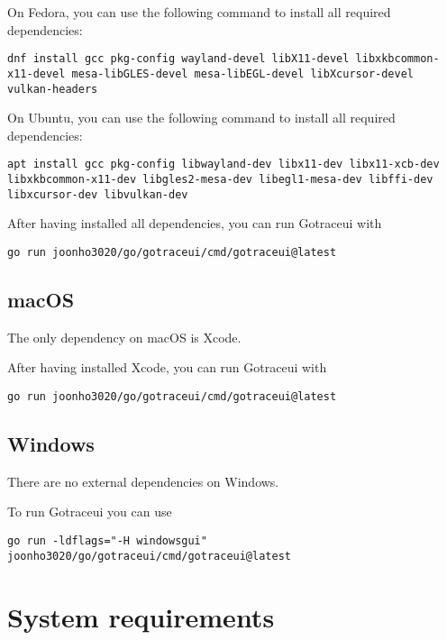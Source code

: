 \documentclass[10pt,letterpaper,oneside,openany,english]{memoir}
\begin{document}
On Fedora, you can use the following command to install all required dependencies:

\begin{verbatim}
dnf install gcc pkg-config wayland-devel libX11-devel libxkbcommon-x11-devel mesa-libGLES-devel mesa-libEGL-devel libXcursor-devel vulkan-headers
\end{verbatim}

On Ubuntu, you can use the following command to install all required dependencies:

\begin{verbatim}
apt install gcc pkg-config libwayland-dev libx11-dev libx11-xcb-dev libxkbcommon-x11-dev libgles2-mesa-dev libegl1-mesa-dev libffi-dev libxcursor-dev libvulkan-dev
\end{verbatim}

After having installed all dependencies, you can run Gotraceui with

\begin{verbatim}
go run joonho3020/go/gotraceui/cmd/gotraceui@latest
\end{verbatim}

\section*{macOS}

The only dependency on macOS is Xcode.

After having installed Xcode, you can run Gotraceui with

\begin{verbatim}
go run joonho3020/go/gotraceui/cmd/gotraceui@latest
\end{verbatim}

\section*{Windows}

There are no external dependencies on Windows.

To run Gotraceui you can use

\begin{verbatim}
go run -ldflags="-H windowsgui" joonho3020/go/gotraceui/cmd/gotraceui@latest
\end{verbatim}

\chapter{System requirements}
\end{document}
